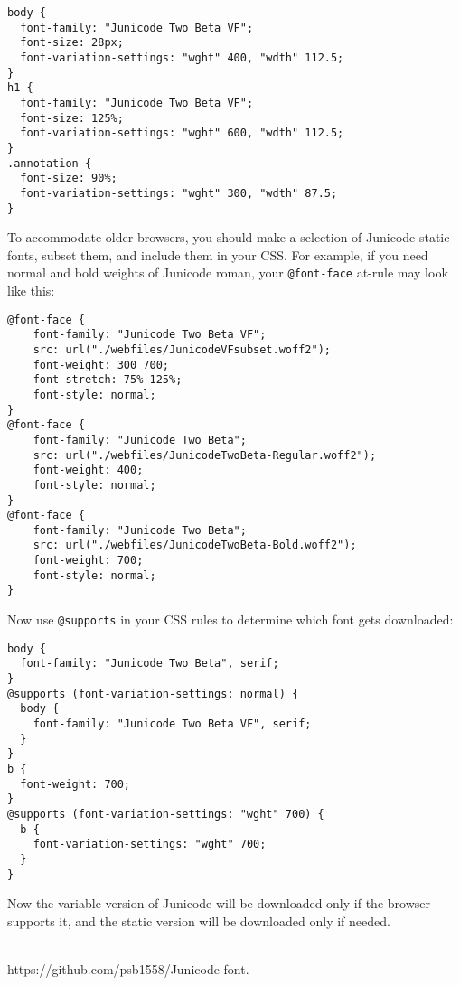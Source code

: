 \documentclass[12pt,letterpaper,openany]{book}
\newcounter{Feature}
\begin{document}
\begin{verbatim}
body {
  font-family: "Junicode Two Beta VF";
  font-size: 28px;
  font-variation-settings: "wght" 400, "wdth" 112.5;
}
h1 {
  font-family: "Junicode Two Beta VF";
  font-size: 125%;
  font-variation-settings: "wght" 600, "wdth" 112.5;
}
.annotation {
  font-size: 90%;
  font-variation-settings: "wght" 300, "wdth" 87.5;
}
\end{verbatim}

\noindent To accommodate older browsers, you should make a selection of
Junicode static fonts, subset them, and include them in your CSS. For example,
if you need normal and bold weights of Junicode roman, your
\texttt{@font-face} at-rule may look like this:

\begin{verbatim}
@font-face {
    font-family: "Junicode Two Beta VF";
    src: url("./webfiles/JunicodeVFsubset.woff2");
    font-weight: 300 700;
    font-stretch: 75% 125%;
    font-style: normal;
}
@font-face {
    font-family: "Junicode Two Beta";
    src: url("./webfiles/JunicodeTwoBeta-Regular.woff2");
    font-weight: 400;
    font-style: normal;
}
@font-face {
    font-family: "Junicode Two Beta";
    src: url("./webfiles/JunicodeTwoBeta-Bold.woff2");
    font-weight: 700;
    font-style: normal;
}
\end{verbatim}

\noindent Now use \texttt{@supports} in your CSS rules to determine which
font gets downloaded:

\begin{verbatim}
body {
  font-family: "Junicode Two Beta", serif;
}
@supports (font-variation-settings: normal) {
  body {
    font-family: "Junicode Two Beta VF", serif;
  }
}
b {
  font-weight: 700;
}
@supports (font-variation-settings: "wght" 700) {
  b {
    font-variation-settings: "wght" 700;
  }
}
\end{verbatim}

\noindent Now the variable version of Junicode will be downloaded only if
the browser supports it, and the static version will be downloaded only if
needed.


\vspace*{\fill}
\begin{center}
{}\\
{\color{BrickRed}https://github.com/psb1558/Junicode-font.}
\end{center}
\end{document}
